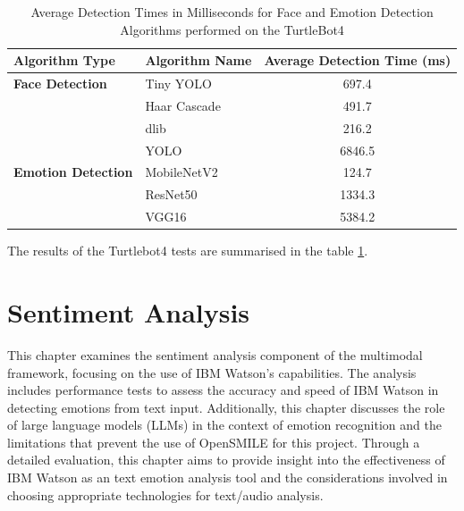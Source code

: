 \begin{table}[h!]
\centering{}
\caption{Average Detection Times in Milliseconds for Face and Emotion Detection Algorithms performed on the TurtleBot4}
\begin{tabular}{|l|l|c|}
\hline
\textbf{Algorithm Type} & \textbf{Algorithm Name} & \textbf{Average Detection Time (ms)} \\ \hline
\textbf{Face Detection} & Tiny YOLO               & 697.4                                \\ \cline{2-3}
                        & Haar Cascade            & 491.7                                \\ \cline{2-3}
                        & dlib                    & 216.2                                \\ \cline{2-3}
                        & YOLO                    & 6846.5                               \\ \hline
\textbf{Emotion Detection} & MobileNetV2          & 124.7                                \\ \cline{2-3}
                        & ResNet50                & 1334.3                               \\ \cline{2-3}
                        & VGG16                   & 5384.2                               \\ \hline
\end{tabular}
\label{tab:algorithm_detection_times_ms_robot}
\end{table}

The results of the Turtlebot4 tests are summarised in the table \ref{tab:algorithm_detection_times_ms_robot}.

\section{Sentiment Analysis}

This chapter examines the sentiment analysis component of the multimodal framework, focusing on the use of IBM Watson's capabilities. The analysis includes performance tests to assess the accuracy and speed of IBM Watson in detecting emotions from text input. Additionally, this chapter discusses the role of large language models (LLMs) in the context of emotion recognition and the limitations that prevent the use of OpenSMILE for this project. Through a detailed evaluation, this chapter aims to provide insight into the effectiveness of IBM Watson as an text emotion analysis tool and the considerations involved in choosing appropriate technologies for text/audio analysis.

